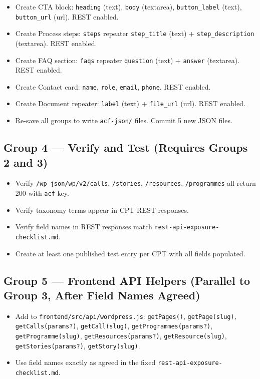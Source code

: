 \documentclass[12pt,a4paper]{article}
\begin{document}
\begin{itemize}
    \item[$\square$] Create CTA block: \texttt{heading} (text), \texttt{body} (textarea), \texttt{button\_label} (text), \texttt{button\_url} (url). REST enabled.
    \item[$\square$] Create Process steps: \texttt{steps} repeater \textrightarrow{} \texttt{step\_title} (text) + \texttt{step\_description} (textarea). REST enabled.
    \item[$\square$] Create FAQ section: \texttt{faqs} repeater \textrightarrow{} \texttt{question} (text) + \texttt{answer} (textarea). REST enabled.
    \item[$\square$] Create Contact card: \texttt{name}, \texttt{role}, \texttt{email}, \texttt{phone}. REST enabled.
    \item[$\square$] Create Document repeater: \texttt{label} (text) + \texttt{file\_url} (url). REST enabled.
    \item[$\square$] Re-save all groups to write \texttt{acf-json/} files. Commit 5 new JSON files.
\end{itemize}

\subsection{Group 4 --- Verify and Test (Requires Groups 2 and 3)}

\begin{itemize}
    \item[$\square$] Verify \texttt{/wp-json/wp/v2/calls}, \texttt{/stories}, \texttt{/resources}, \texttt{/programmes} all return 200 with \texttt{acf} key.
    \item[$\square$] Verify taxonomy terms appear in CPT REST responses.
    \item[$\square$] Verify field names in REST responses match \texttt{rest-api-exposure-checklist.md}.
    \item[$\square$] Create at least one published test entry per CPT with all fields populated.
\end{itemize}

\subsection{Group 5 --- Frontend API Helpers (Parallel to Group 3, After Field Names Agreed)}

\begin{itemize}
    \item[$\square$] Add to \texttt{frontend/src/api/wordpress.js}: \texttt{getPages()}, \texttt{getPage(slug)}, \texttt{getCalls(params?)}, \texttt{getCall(slug)}, \texttt{getProgrammes(params?)}, \texttt{getProgramme(slug)}, \texttt{getResources(params?)}, \texttt{getResource(slug)}, \texttt{getStories(params?)}, \texttt{getStory(slug)}.
    \item[$\square$] Use field names exactly as agreed in the fixed \texttt{rest-api-exposure-checklist.md}.
\end{itemize}
\end{document}
